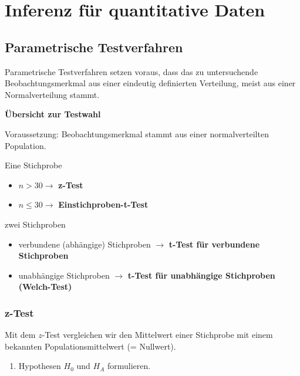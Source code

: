 \documentclass[
]{book}
\providecommand{\tightlist}{%
  \setlength{\itemsep}{0pt}\setlength{\parskip}{0pt}}
\begin{document}
\hypertarget{inferenz-fuxfcr-quantitative-daten}{%
\chapter{Inferenz für quantitative Daten}\label{inferenz-fuxfcr-quantitative-daten}}

\hypertarget{parametrische-testverfahren}{%
\section{Parametrische Testverfahren}\label{parametrische-testverfahren}}

Parametrische Testverfahren setzen voraus, dass das zu untersuchende Beobachtungsmerkmal aus einer eindeutig definierten Verteilung, meist aus einer Normalverteilung stammt.

\textbf{Übersicht zur Testwahl}

Voraussetzung: Beobachtungsmerkmal stammt aus einer normalverteilten Population.

Eine Stichprobe

\begin{itemize}
\tightlist
\item
  \(n > 30 \rightarrow\) \textbf{z-Test}\\
\item
  \(n \leq 30 \rightarrow\) \textbf{Einstichproben-t-Test}
\end{itemize}

zwei Stichproben

\begin{itemize}
\tightlist
\item
  verbundene (abhängige) Stichproben \(\rightarrow\) \textbf{t-Test für verbundene Stichproben}\\
\item
  unabhängige Stichproben \(\rightarrow\) \textbf{t-Test für unabhängige Stichproben (Welch-Test)}
\end{itemize}

\hypertarget{z-test}{%
\subsection{z-Test}\label{z-test}}

Mit dem \(z\)-Test vergleichen wir den Mittelwert einer Stichprobe mit einem bekannten
Populationsmittelwert (= Nullwert).

\begin{enumerate}
\def\labelenumi{\arabic{enumi}.}
\tightlist
\item
  Hypothesen \(H_0\) und \(H_A\) formulieren.
\end{enumerate}
\end{document}

